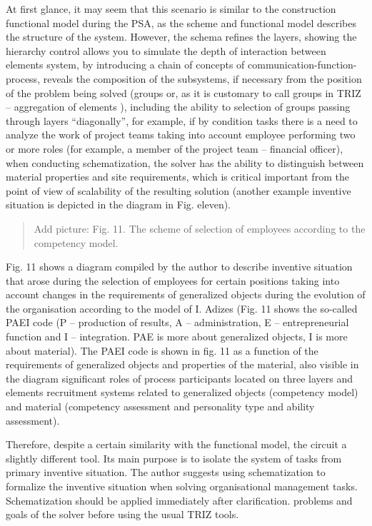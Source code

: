 \documentclass[11pt,a4paper]{book}
\newcommand{\addpicture}[1]{
  \begin{quote} Add picture: #1\end{quote}
}
\begin{document}
At first glance, it may seem that this scenario is similar to the construction
functional model during the PSA, as the scheme and functional model describes
the structure of the system. However, the schema refines the layers, showing
the hierarchy control allows you to simulate the depth of interaction between
elements system, by introducing a chain of concepts of
communication-function-process, reveals the composition of the subsystems, if
necessary from the position of the problem being solved (groups or, as it is
customary to call groups in TRIZ -- aggregation of elements ), including the
ability to selection of groups passing through layers “diagonally”, for
example, if by condition tasks there is a need to analyze the work of project
teams taking into account employee performing two or more roles (for example,
a member of the project team -- financial officer), when conducting
schematization, the solver has the ability to distinguish between material
properties and site requirements, which is critical important from the point
of view of scalability of the resulting solution (another example inventive
situation is depicted in the diagram in Fig. eleven).

\addpicture{Fig. 11. The scheme of selection of employees according to the
  competency model.}

Fig. 11 shows a diagram compiled by the author to describe inventive situation
that arose during the selection of employees for certain positions taking into
account changes in the requirements of generalized objects during the evolution of the
organisation according to the model of I. Adizes (Fig. 11 shows the so-called
PAEI code (P -- production of results, A -- administration, E --
entrepreneurial function and I -- integration. PAE is more about generalized objects, I is
more about material). The PAEI code is shown in fig. 11 as a function of the
requirements of generalized objects and properties of the material, also visible in the
diagram significant roles of process participants located on three layers and
elements recruitment systems related to generalized objects (competency model) and material
(competency assessment and personality type and ability assessment).

Therefore, despite a certain similarity with the functional model, the circuit
a slightly different tool. Its main purpose is to isolate the system of tasks
from primary inventive situation. The author suggests using schematization to
formalize the inventive situation when solving organisational management
tasks. Schematization should be applied immediately after clarification.
problems and goals of the solver before using the usual TRIZ tools.
\end{document}
